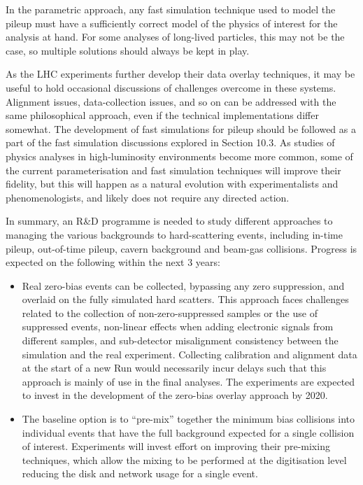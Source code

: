 \documentclass[12pt,a4paper]{article}
\begin{document}
In the parametric approach, any fast simulation technique used to model
the pileup must have a sufficiently correct model of the physics of
interest for the analysis at hand. For some analyses of long-lived
particles, this may not be the case, so multiple solutions should always
be kept in play.

As the LHC experiments further develop their data overlay techniques, it
may be useful to hold occasional discussions of challenges overcome in
these systems. Alignment issues, data-collection issues, and so on can
be addressed with the same philosophical approach, even if the technical
implementations differ somewhat. The development of fast simulations for
pileup should be followed as a part of the fast simulation discussions
explored in Section 10.3. As studies of physics analyses in
high-luminosity environments become more common, some of the current
parameterisation and fast simulation techniques will improve their
fidelity, but this will happen as a natural evolution with
experimentalists and phenomenologists, and likely does not require any
directed action.

In summary, an R\&D programme is needed to study different approaches to
managing the various backgrounds to hard-scattering events, including
in-time pileup, out-of-time pileup, cavern background and beam-gas
collisions. Progress is expected on the following within the next 3
years:

\begin{itemize}
\item
  Real zero-bias events can be collected, bypassing any zero
  suppression, and overlaid on the fully simulated hard scatters. This
  approach faces challenges related to the collection of
  non-zero-suppressed samples or the use of suppressed events,
  non-linear effects when adding electronic signals from different
  samples, and sub-detector misalignment consistency between the
  simulation and the real experiment. Collecting calibration and
  alignment data at the start of a new Run would necessarily incur
  delays such that this approach is mainly of use in the final analyses.
  The experiments are expected to invest in the development of the
  zero-bias overlay approach by 2020.
\item
  The baseline option is to ``pre-mix'' together the minimum bias
  collisions into individual events that have the full background
  expected for a single collision of interest. Experiments will invest
  effort on improving their pre-mixing techniques, which allow the
  mixing to be performed at the digitisation level reducing the disk and
  network usage for a single event.
\end{itemize}
\end{document}
